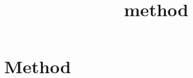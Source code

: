 \documentclass{article}
\title{method}
\begin{document}
\maketitle

\section{Method}
\end{document}
